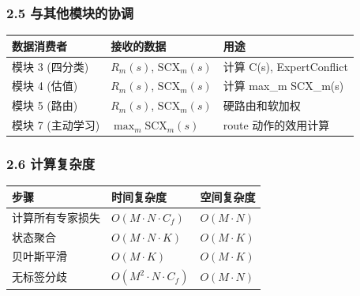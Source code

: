\documentclass[
  12pt,
]{ctexart}
\begin{document}
\subsubsection{2.5
与其他模块的协调}\label{ux4e0eux5176ux4ed6ux6a21ux5757ux7684ux534fux8c03-1}

\begin{longtable}[]{@{}
  >{\raggedright\arraybackslash}p{}
  >{\raggedright\arraybackslash}p{}
  >{\raggedright\arraybackslash}p{}@{}}
\toprule\noalign{}
\begin{minipage}[b]{\linewidth}\raggedright
数据消费者
\end{minipage} & \begin{minipage}[b]{\linewidth}\raggedright
接收的数据
\end{minipage} & \begin{minipage}[b]{\linewidth}\raggedright
用途
\end{minipage} \\
\midrule\noalign{}
\endhead
\bottomrule\noalign{}
\endlastfoot
模块 3 (四分类) & \(R_m(s)\), \(\text{SCX}_m(s)\) & 计算 C(s),
ExpertConflict \\
模块 4 (估值) & \(R_m(s)\), \(\text{SCX}_m(s)\) & 计算 max\_m
SCX\_m(s) \\
模块 5 (路由) & \(R_m(s)\), \(\text{SCX}_m(s)\) & 硬路由和软加权 \\
模块 7 (主动学习) & \(\max_m \text{SCX}_m(s)\) & route 动作的效用计算 \\
\end{longtable}

\subsubsection{2.6 计算复杂度}\label{ux8ba1ux7b97ux590dux6742ux5ea6-1}

\begin{longtable}[]{@{}lll@{}}
\toprule\noalign{}
步骤 & 时间复杂度 & 空间复杂度 \\
\midrule\noalign{}
\endhead
\bottomrule\noalign{}
\endlastfoot
计算所有专家损失 & \(O(M \cdot N \cdot C_f)\) & \(O(M \cdot N)\) \\
状态聚合 & \(O(M \cdot N \cdot K)\) & \(O(M \cdot K)\) \\
贝叶斯平滑 & \(O(M \cdot K)\) & \(O(M \cdot K)\) \\
无标签分歧 & \(O(M^2 \cdot N \cdot C_f)\) & \(O(M \cdot N)\) \\
\end{longtable}
\end{document}
